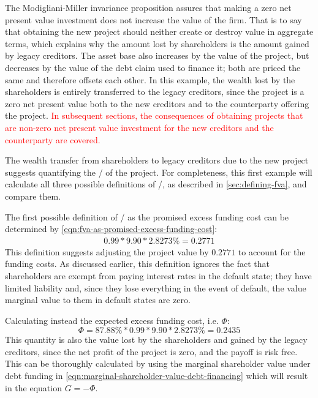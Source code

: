 \documentclass[main.tex]{subfiles}
\begin{document}
        The Modigliani-Miller invariance proposition assures that making a zero net present value investment 
        does not increase the value of the firm.
        That is to say that obtaining the new project should neither create or destroy value in aggregate terms,
        which explains why the amount lost by shareholders is the amount gained by legacy creditors.
        The asset base also increases by the value of the project, 
        but decreases by the value of the debt claim used to finance it; 
        both are priced the same and therefore offsets each other.
        In this example, the wealth lost by the shareholders is entirely transferred to the legacy creditors,
        since the project is a zero net present value both to the new creditors 
        and to the counterparty offering the project.
        \textcolor{red}{
            In subsequent sections, the consequences of obtaining projects that are non-zero net present value investment
            for the new creditors and the counterparty are covered.
        }

        The wealth transfer from shareholders to legacy creditors due to the new project 
        suggests quantifying the \FVA/ of the project.
        For completeness, this first example will calculate all three possible definitions of \FVA/,
        as described in \cref{sec:defining-fva}, and compare them.

        The first possible definition of \FVA/ as the promised excess funding cost can be determined by
        \cref{eqn:fva-as-promised-excess-funding-cost}:
            \begin{align}
                0.99 * 9.90 * 2.8273\% = 0.2771
            \end{align}
        This definition suggests adjusting the project value by $0.2771$ to account for the funding costs.
        As discussed earlier, this definition ignores the fact that shareholders are exempt from paying
        interest rates in the default state; they have limited liability and, since they lose everything
        in the event of default, the value marginal value to them in default states are zero.
        
        Calculating instead the expected excess funding cost, i.e. $\Phi$:
            \begin{equation}
                \Phi 
                = 87.88\% * 0.99  * 9.90 * 2.8273\% 
                = 0.2435
            \end{equation}
        This quantity is also the value lost by the shareholders and gained by the legacy creditors,
        since the net profit of the project is zero, and the payoff is risk free.
        This can be thoroughly calculated by using the marginal shareholder value under debt funding in 
        \cref{eqn:marginal-shareholder-value-debt-financing}
        which will result in the equation $G = -\Phi$. 
        
\end{document}
